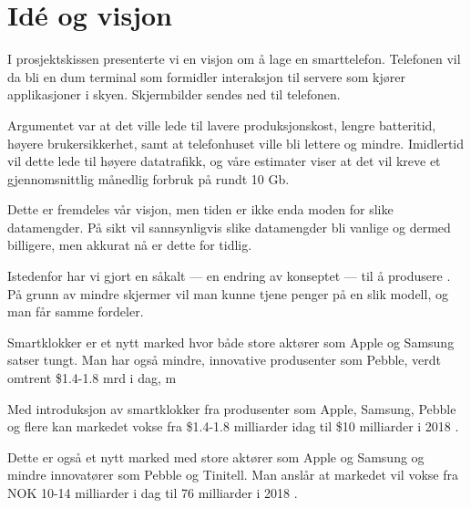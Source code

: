 \section{Idé og visjon}

I prosjektskissen presenterte vi en visjon om å lage en 
smarttelefon. Telefonen vil da bli en dum terminal som formidler interaksjon
til servere som kjører applikasjoner i skyen. Skjermbilder sendes ned til
telefonen.

Argumentet var at det ville lede til lavere produksjonskost, lengre
batteritid, høyere brukersikkerhet, samt at telefonhuset ville bli lettere og
mindre.  Imidlertid vil dette lede til høyere datatrafikk, og våre estimater
viser at det vil kreve et gjennomsnittlig månedlig forbruk på rundt 10 Gb.

Dette er fremdeles vår visjon, men tiden er ikke enda moden for slike
datamengder. På sikt vil sannsynligvis slike datamengder bli vanlige og dermed
billigere, men akkurat nå er dette for tidlig.

Istedenfor har vi gjort en såkalt  --- en endring av
konseptet --- til å produsere .  På grunn av
mindre skjermer vil man kunne tjene penger på en slik modell, og man får samme
fordeler. 

Smartklokker er et nytt marked hvor både store aktører som Apple og Samsung
satser tungt. Man har også mindre, innovative produsenter som Pebble, verdt omtrent \${}1.4-1.8 mrd i dag, m

Med introduksjon av smartklokker fra produsenter som Apple, Samsung, Pebble og
flere kan markedet vokse fra \${}1.4-1.8 milliarder idag til \${}10
milliarder i 2018 \cite{citi.grow}.

Dette er også et nytt marked med store aktører som Apple og Samsung
og mindre innovatører som Pebble og Tinitell. Man anslår at markedet vil vokse
fra NOK 10-14 milliarder i dag til 76 milliarder i 2018 \cite{citi.grow}.


